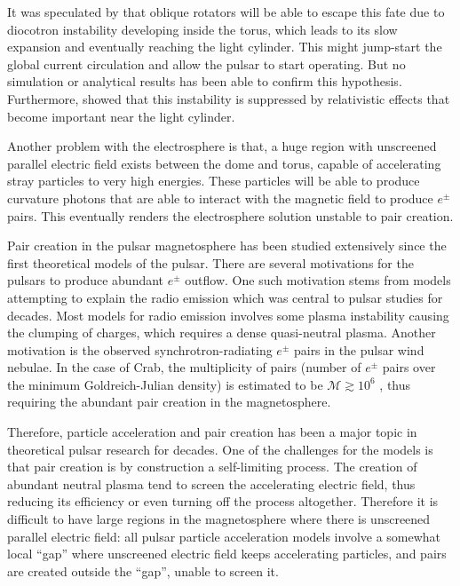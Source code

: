 It was speculated by \citet{spitkovsky_electrodynamics_2004} that oblique
rotators will be able to escape this fate due to diocotron instability
developing inside the torus, which leads to its slow expansion and eventually
reaching the light cylinder. This might jump-start the global current
circulation and allow the pulsar to start operating. But no simulation or
analytical results has been able to confirm this hypothesis. Furthermore,
\citet{petri_relativistic_2007} showed that this instability is suppressed by
relativistic effects that become important near the light cylinder.

Another problem with the electrosphere is that, a huge region with unscreened
parallel electric field exists between the dome and torus, capable of
accelerating stray particles to very high energies. These particles will be able
to produce curvature photons that are able to interact with the magnetic field
to produce $e^{\pm}$ pairs. This eventually renders the electrosphere solution
unstable to pair creation.

Pair creation in the pulsar magnetosphere has been studied extensively since the
first theoretical models of the pulsar. There are several motivations for the
pulsars to produce abundant $e^{\pm}$ outflow. One such motivation stems from
models attempting to explain the radio emission which was central to pulsar
studies for decades. Most models for radio emission involves some plasma
instability causing the clumping of charges, which requires a dense
quasi-neutral plasma. Another motivation is the observed synchrotron-radiating
$e^{\pm}$ pairs in the pulsar wind nebulae. In the case of Crab, the
multiplicity of pairs (number of $e^{\pm}$ pairs over the minimum
Goldreich-Julian density) is estimated to be $\mathcal{M} \gtrsim 10^{6}$
\citep{de_jager_gamma-ray_1996}, thus requiring the abundant pair creation in
the magnetosphere.

Therefore, particle acceleration and pair creation has been a major topic in
theoretical pulsar research for decades. One of the challenges for the models is
that pair creation is by construction a self-limiting process. The creation of
abundant neutral plasma tend to screen the accelerating electric field, thus
reducing its efficiency or even turning off the process altogether. Therefore it
is difficult to have large regions in the magnetosphere where there is
unscreened parallel electric field: all pulsar particle acceleration models
involve a somewhat local ``gap'' where unscreened electric field keeps
accelerating particles, and pairs are created outside the ``gap'', unable to
screen it.

